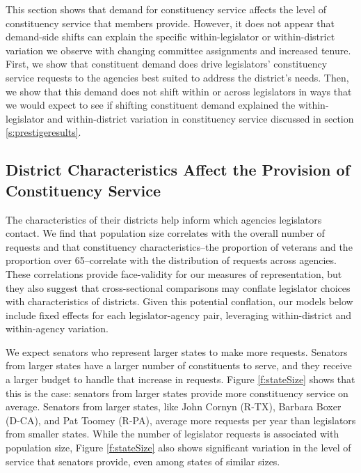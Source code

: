 \documentclass[12pt]{article}
\begin{document}
This section shows that demand for constituency service affects the level of constituency service that members provide. However, it does not appear that demand-side shifts can explain the specific within-legislator or within-district variation we observe with changing committee assignments and increased tenure. First, we show that constituent demand does drive legislators' constituency service requests to the agencies best suited to address the district's needs. Then, we show that this demand does not shift within or across legislators in ways that we would expect to see if shifting constituent demand explained the within-legislator and within-district variation in constituency service discussed in section \ref{s:prestigeresults}.

\subsection{District Characteristics Affect the Provision of Constituency Service }

The characteristics of their districts help inform which agencies legislators contact. We find that population size correlates with the overall number of requests and that constituency characteristics--the proportion of veterans and the proportion over 65--correlate with the distribution of requests across agencies. These correlations provide face-validity for our measures of representation, but they also suggest that cross-sectional comparisons may conflate legislator choices with characteristics of districts. Given this potential conflation, our models below include fixed effects for each legislator-agency pair, leveraging within-district and within-agency variation.  

We expect senators who represent larger states to make more requests. Senators from larger states have a larger number of constituents to serve, and they receive a larger budget to handle that increase in requests.
Figure \ref{f:stateSize} shows that this is the case: senators from larger states provide more constituency service on average. Senators from larger states, like John Cornyn (R-TX), Barbara Boxer (D-CA), and Pat Toomey (R-PA), average more requests per year than legislators from smaller states. While the number of legislator requests is associated with population size, Figure \ref{f:stateSize} also shows significant variation in the level of service that senators provide, even among states of similar sizes.  
\end{document}
